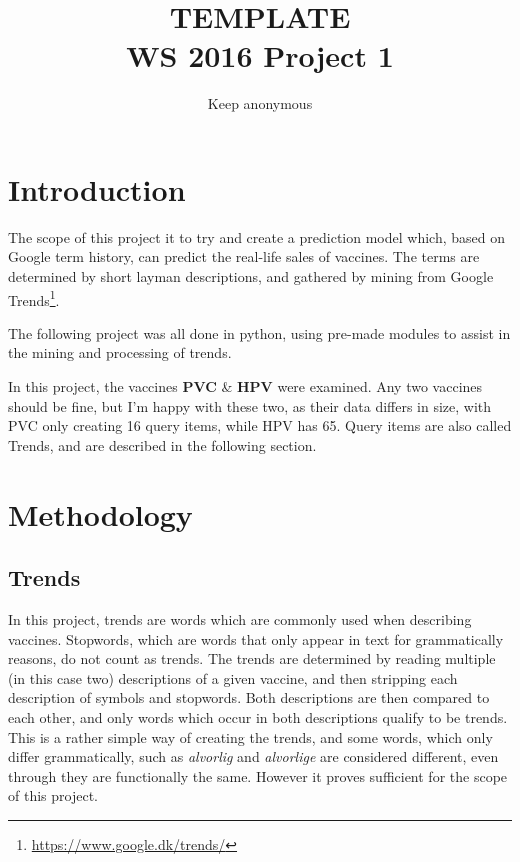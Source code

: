 \documentclass{sig-alternate}
\begin{document}
\title{TEMPLATE\\WS 2016 Project 1}
\author{
\alignauthor 
Keep anonymous
}
\maketitle



\section{Introduction}
The scope of this project it to try and create a prediction model which, based on Google term history, can predict the real-life sales of vaccines. The terms are determined by short layman descriptions, and gathered by mining from Google Trends\footnote{\url{https://www.google.dk/trends/}}.

The following project was all done in python, using pre-made modules to assist in the mining and processing of trends.

In this project, the vaccines \textbf{PVC} \& \textbf{HPV} were examined. Any two vaccines should be fine, but I'm happy with these two, as their data differs in size, with PVC only creating 16 query items, while HPV has 65. Query items are also called Trends, and are described in the following section.

\section{Methodology}
\subsection{Trends}
In this project, trends are words which are commonly used when describing vaccines. Stopwords, which are words that only appear in text for grammatically reasons, do not count as trends. The trends are determined by reading multiple (in this case two) descriptions of a given vaccine, and then stripping each description of symbols and stopwords. Both descriptions are then compared to each other, and only words which occur in both descriptions qualify to be trends. This is a rather simple way of creating the trends, and some words, which only differ grammatically, such as \textit{alvorlig} and \textit {alvorlige} are considered different, even through they are functionally the same. However it proves sufficient for the scope of this project.
\end{document}
